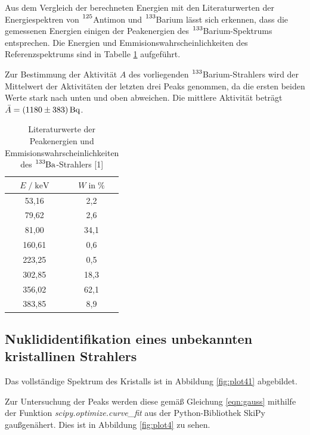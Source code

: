 Aus dem Vergleich der berechneten Energien mit den Literaturwerten der Energiespektren von $\ce{^{125}}$Antimon und 
$\ce{^{133}}$Barium lässt sich erkennen, dass die gemessenen Energien einigen der Peakenergien des
$\ce{^{133}}$Barium-Spektrums entsprechen. Die Energien und Emmisionswahrscheinlichkeiten des Referenzspektrums 
sind in Tabelle \ref{tab:mess6} aufgeführt.

Zur Bestimmung der Aktivität $A$ des vorliegenden $\ce{^{133}}$Barium-Strahlers wird der Mittelwert der Aktivitäten der letzten drei
Peaks genommen, da die ersten beiden Werte stark nach unten und oben abweichen.
Die mittlere Aktivität beträgt $\bar{A} = \SI{1180 +- 383}{\becquerel}$.

\begin{table}
  \centering
  \caption{Literaturwerte der Peakenergien und Emmisionswahrscheinlichkeiten des $\ce{^{133}Ba}$-Strahlers [1]}
  \label{tab:mess6}
  \begin{tabular}{c c}
  \toprule
  $E \;/\; \si{\kilo\eV}$ & $W \;\text{in}\; \si{\percent}$ \\
  \midrule
     53,16 &  2,2 \\
     79,62 &  2,6 \\
     81,00 & 34,1 \\
    160,61 &  0,6 \\
    223,25 &  0,5 \\
    302,85 & 18,3 \\
    356,02 & 62,1 \\
    383,85 &  8,9 \\
  \bottomrule
  \end{tabular}
\end{table}


\subsection{Nuklididentifikation %
            eines unbekannten kristallinen Strahlers}

Das vollständige Spektrum des Kristalls ist in Abbildung \ref{fig:plot41} abgebildet.



Zur Untersuchung der Peaks werden diese gemäß Gleichung \eqref{eqn:gauss} 
mithilfe der Funktion \textit{scipy.optimize.curve\_fit} aus der Python-Bibliothek SkiPy gaußgenähert.
Dies ist in Abbildung \ref{fig:plot4} zu sehen.

